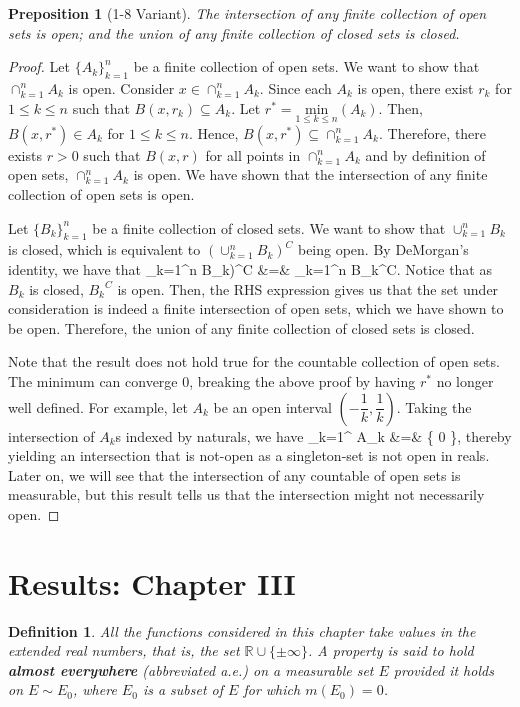 \documentclass{article} %
\def\eQb#1\eQe{\begin{eqnarray*}#1\end{eqnarray*}}
\theoremstyle{quest}
\newtheorem*{definition}{Definition}
\newtheorem*{preposition}{Preposition}
\begin{document}
\begin{preposition}[1-8 Variant]
The intersection of any finite collection of open sets is open; and the union of any finite
collection of closed sets is closed.
\end{preposition}
\begin{proof} Let $\{ A_k \}_{k=1}^{n}$ be a finite collection of open sets. We want to show
that $\cap_{k=1}^{n} A_k$ is open. Consider $x \in \cap_{k=1}^{n} A_k$. Since each $A_k$ is open, 
there exist $r_k$ for $1 \leq k \leq n$ such that $B(x,r_k) \subseteq A_k$. Let $r^* = 
\underset{1 \leq k 
\leq n}{\text{min}}( A_k )$. Then, $B(x,r^*) \in A_k$ for $1 \leq k \leq n$. Hence,
$B(x,r^*) \subseteq \cap_{k=1}^{n} A_k$. Therefore, there exists $r > 0$ such that
$B(x,r)$ for all points in $\cap_{k=1}^{n} A_k$ and by definition of open sets,
$\cap_{k=1}^{n} A_k$ is open. 
We have shown that the intersection of any finite collection of open sets is open. \\

\smallskip

Let $\{ B_k \}_{k=1}^{n}$ be a finite
collection of closed sets. We want to show that $\cup_{k=1}^{n} B_k$ is closed, which is 
equivalent to $(\cup_{k=1}^{n} B_k)^{C}$ being open. By DeMorgan's identity, we have that
\eQb
(\cup_{k=1}^{n} B_k)^{C} &=& \cap_{k=1}^{n} {B_k}^{C}.
\eQe
Notice that as $B_k$ is closed, ${B_k}^{C}$ is open. Then, 
the RHS expression gives us that the set under consideration is indeed a finite
intersection of open sets, which we have shown to be open. Therefore, the union 
of any finite collection of closed sets is closed. \\

\smallskip

Note that the result does not hold true for the countable collection of open sets. The minimum can
converge $0$, breaking the above proof by having $r^*$ no longer well defined. For example,
let $A_k$ be an open interval $(-\dfrac{1}{k}, \dfrac{1}{k})$. Taking the intersection of $A_k$s 
indexed by naturals, we have 
\eQb
\cap_{k=1}^{\infty} A_k &=& \{ 0 \},
\eQe
thereby yielding an intersection that is not-open as a singleton-set is not open in reals.
Later on, we will see that the intersection of any countable of open sets is
measurable, but this result
tells us that the intersection might not necessarily open.
\end{proof}

\section{Results: Chapter III}
\begin{definition}
All the functions considered in this chapter take values in the 
extended real numbers, that is, the set $\mathbb{R} \cup \{ \pm \infty \}$.
A property is said to hold \textbf{almost everywhere} (abbreviated a.e.) on
a measurable set $E$ provided it holds on $E \sim E_0$, where $E_0$ is a subset
of $E$ for which $m(E_0)= 0$.
\end{definition}
\end{document}
